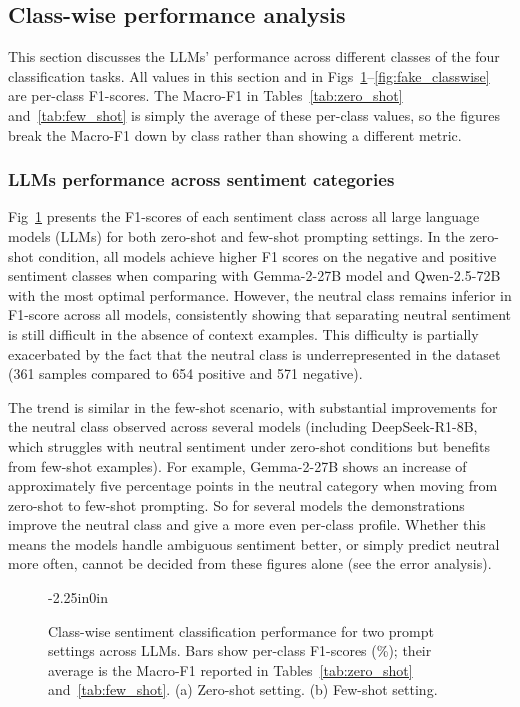 \documentclass[10pt,letterpaper]{article}
\begin{document}
\subsection*{Class-wise performance analysis}

This section discusses the LLMs' performance across different classes of the four classification tasks. All values in this section and in Figs~\ref{fig:sentiment_classes}--\ref{fig:fake_classwise} are per-class F1-scores. The Macro-F1 in Tables~\ref{tab:zero_shot} and~\ref{tab:few_shot} is simply the average of these per-class values, so the figures break the Macro-F1 down by class rather than showing a different metric.

\subsubsection*{LLMs performance across sentiment categories}
\label{sec:sentiment_classes}

Fig~\ref{fig:sentiment_classes} presents the F1-scores of each sentiment class across all large language models (LLMs) for both zero-shot and few-shot prompting settings. In the zero-shot condition, all models achieve higher F1 scores on the negative and positive sentiment classes when comparing with Gemma-2-27B model and Qwen-2.5-72B with the most optimal performance. However, the neutral class remains inferior in F1-score across all models, consistently showing that separating neutral sentiment is still difficult in the absence of context examples. This difficulty is partially exacerbated by the fact that the neutral class is underrepresented in the dataset (361 samples compared to 654 positive and 571 negative).

The trend is similar in the few-shot scenario, with substantial improvements for the neutral class observed across several models (including DeepSeek-R1-8B, which struggles with neutral sentiment under zero-shot conditions but benefits from few-shot examples). For example, Gemma-2-27B shows an increase of approximately five percentage points in the neutral category when moving from zero-shot to few-shot prompting. So for several models the demonstrations improve the neutral class and give a more even per-class profile. Whether this means the models handle ambiguous sentiment better, or simply predict neutral more often, cannot be decided from these figures alone (see the error analysis).

\begin{figure}[t]
\begin{adjustwidth}{-2.25in}{0in}
    \centering
    \caption{Class-wise sentiment classification performance for two prompt settings across LLMs. Bars show per-class F1-scores (\%); their average is the Macro-F1 reported in Tables~\ref{tab:zero_shot} and~\ref{tab:few_shot}. (a) Zero-shot setting. (b) Few-shot setting.}
    \label{fig:sentiment_classes}
\end{adjustwidth}
\end{figure}
\end{document}
